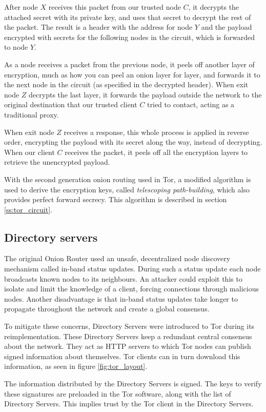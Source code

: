 \documentclass{article}
\begin{document}
		After node $X$ receives this packet from our trusted node $C$, it decrypts the attached secret with its private key, and uses that secret to decrypt the rest of the packet. The result is a header with the address for node $Y$ and the payload encrypted with secrets for the following nodes in the circuit, which is forwarded to node $Y$.
		
		As a node receives a packet from the previous node, it peels off another layer of encryption, much as how you can peel an onion layer for layer, and forwards it to the next node in the circuit (as specified in the decrypted header). When exit node $Z$ decrypts the last layer, it forwards the payload outside the network to the original destination that our trusted client $C$ tried to contact, acting as a traditional proxy.
		
		When exit node $Z$ receives a response, this whole process is applied in reverse order, encrypting the payload with its secret along the way, instead of decrypting. When our client $C$ receives the packet, it peels off all the encryption layers to retrieve the unencrypted payload.
		
		With the second generation onion routing used in Tor, a modified algorithm is used to derive the encryption keys, called \emph{telescoping path-building}, which also provides perfect forward secrecy. This algorithm is described in section \ref{ss:tor_circuit}.
		
	\subsection{Directory servers}
		The original Onion Router used an unsafe, decentralized node discovery mechanism called in-band status updates. During such a status update each node broadcasts known nodes to its neighbours. An attacker could exploit this to isolate and limit the knowledge of a client, forcing connections through malicious nodes. Another disadvantage is that in-band status updates take longer to propagate throughout the network and create a global consensus.
					
		To mitigate these concerns, Directory Servers were introduced to Tor during its reimplementation. These Directory Servers keep a redundant central consensus about the network. They act as HTTP servers to which Tor nodes can publish signed information about themselves. Tor clients can in turn download this information, as seen in figure \ref{fig:tor_layout}.
					
		The information distributed by the Directory Servers is signed. The keys to verify these signatures are preloaded in the Tor software, along with the list of Directory Servers. This implies trust by the Tor client in the Directory Servers.
\end{document}
